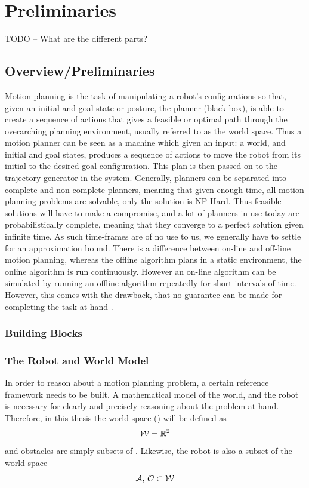 \chapter{Preliminaries}

TODO -- What are the different parts? 

\section{Overview/Preliminaries}
Motion planning is the task of manipulating a robot's configurations so that,
given an initial and goal state or posture, the planner (black box), is able to
create a sequence of actions that gives a feasible or optimal path through the
overarching planning environment, usually referred to as the world space. Thus a
motion planner can be seen as a machine which given an input: a world, and
initial and goal states, produces a sequence of actions to move the robot from
its initial to the desired goal configuration. This plan is then passed on to
the trajectory generator in the system. Generally, planners can be separated
into complete and non-complete planners, meaning that given enough time, all
motion planning problems are solvable, only the solution is NP-Hard. Thus
feasible solutions will have to make a compromise, and a lot of planners in use
today are probabilistically complete, meaning that they converge to a perfect
solution given infinite time. As such time-frames are of no use to us, we
generally have to settle for an approximation bound. There is a difference
between on-line and off-line motion planning, whereas the offline algorithm
plans in a static environment, the online algorithm is run continuously. However
an on-line algorithm can be simulated by running an offline algorithm repeatedly
for short intervals of time. However, this comes with the drawback, that no
guarantee can be made for completing the task at hand \cite{LaValle09}.

\subsection{Building Blocks}

\subsection{The Robot and World Model}

In order to reason about a motion planning problem, a certain reference
framework needs to be built. A mathematical model of the world, and the robot is
necessary for clearly and precisely reasoning about the problem at hand.
Therefore, in this thesis the world space (\modelworld) will be defined as
\[
  \mathcal{W} = \mathbb{R}^2
\]
and obstacles are simply subsets of \modelworld. Likewise, the robot is also a
subset of the world space
\[
  \mathcal{A},\, \mathcal{O} \subset \mathcal{W}
\]

